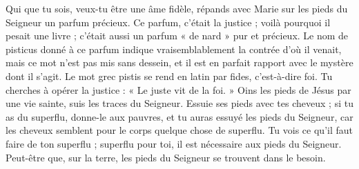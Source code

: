  Qui que tu sois, veux-tu être une âme fidèle, répands avec Marie sur les pieds du Seigneur un parfum précieux. Ce parfum, c’était la justice ; voilà pourquoi il pesait une livre ; c’était aussi un parfum « de nard » pur et précieux. Le nom de pisticus donné à ce parfum indique vraisemblablement la contrée d’où il venait, mais ce mot n’est pas mis sans dessein, et il est en parfait rapport avec le mystère dont il s’agit. Le mot grec pistis se rend en latin par fides, c’est-à-dire foi. Tu cherches à opérer la justice : « Le juste vit de la foi. » Oins les pieds de Jésus par une vie sainte, suis les traces du Seigneur. Essuie ses pieds avec tes cheveux ; si tu as du superflu, donne-le aux pauvres, et tu auras essuyé les pieds du Seigneur, car les cheveux semblent pour le corps quelque chose de superflu. Tu vois ce qu’il faut faire de ton superflu ; superflu pour toi, il est nécessaire aux pieds du Seigneur. Peut-être que, sur la terre, les pieds du Seigneur se trouvent dans le besoin.